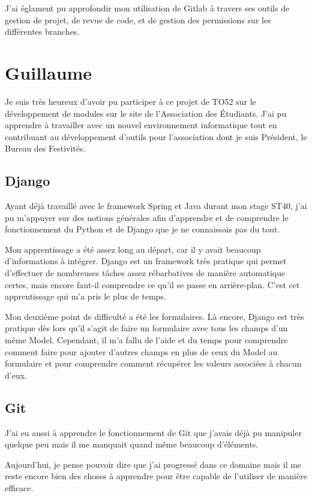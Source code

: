 \documentclass[a4paper]{report}
\begin{document}
\par J'ai églament pu approfondir mon utilisation de Gitlab à travers ses outils de gestion de projet, de revue de code,
et de gestion des permissions sur les différentes branches.

\section{Guillaume}
\label{sec:lo_j}
\par Je suis très heureux d'avoir pu participer à ce projet de TO52 sur le développement de modules sur le site de
l'Association des Étudiants. J'ai pu apprendre à travailler avec un nouvel environnement informatique tout en
contribuant au développement d'outils pour l'association dont je suis Président, le Bureau des Festivités.

\subsection{Django}
\par Ayant déjà travaillé avec le framework Spring et Java durant mon stage ST40, j'ai pu m'appuyer sur des notions
générales afin d'apprendre et de comprendre le fonctionnement du Python et de Django que je ne connaissais pas du tout.

\par Mon apprentissage a été assez long au départ, car il y avait beaucoup d'informations à intégrer. Django est un
framework très pratique qui permet d'effectuer de nombreuses tâches assez rébarbatives de manière automatique certes,
mais encore faut-il comprendre ce qu'il se passe en arrière-plan. C'est cet apprentissage qui m'a pris le plus de temps.

\par Mon deuxième point de difficulté a été les formulaires. Là encore, Django est très pratique dès lors qu'il s'agit
de faire un formulaire avec tous les champs d'un même Model. Cependant, il m'a fallu de l'aide et du temps pour
comprendre comment faire pour ajouter d'autres champs en plus de ceux du Model au formulaire et pour comprendre comment
récupérer les valeurs associées à chacun d'eux.

\subsection{Git}
\par J'ai eu aussi à apprendre le fonctionnement de Git que j'avais déjà pu manipuler quelque peu mais il me manquait
quand même beaucoup d'éléments.

\par Aujourd'hui, je pense pouvoir dire que j'ai progressé dans ce domaine mais il me reste encore bien des choses à
apprendre pour être capable de l'utiliser de manière efficace.


\end{document}
